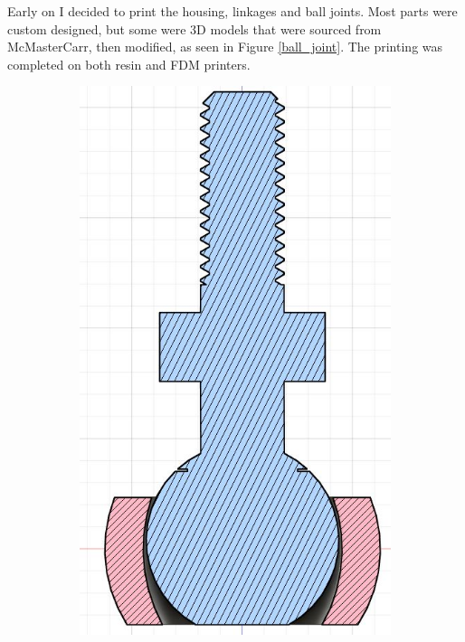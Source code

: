\documentclass[a4paper, 10pt]{article}
\begin{document}
		Early on I decided to print the housing, linkages and ball joints. Most parts were custom designed, but some were 3D models that were sourced from McMasterCarr, then modified, as seen in Figure \ref{ball_joint}. The printing was completed on both resin and FDM printers.
		
		\begin{figure}[h]
			\centering
			\begin{subfigure}[h]{0.34\textwidth}
				\centering
				\includegraphics[width=\textwidth]{Photos/section_ball_joint}

\end{subfigure}
\end{figure}
\end{document}

